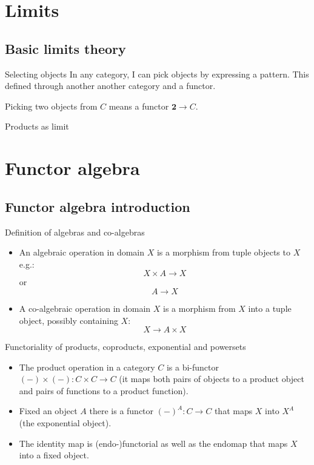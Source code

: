\documentclass[presentation]{beamer}
\begin{document}
\section{Limits}
\label{sec:org3b2836d}
\subsection{Basic limits theory}
\label{sec:org752afb4}
\begin{frame}[label={sec:orga82c59c}]{Selecting objects}
In any category, I can pick objects by expressing a pattern. This defined
through another another category and a functor.

Picking two objects from \(C\) means a functor \(\textbf{2} \rightarrow C\).
\end{frame}

\begin{frame}[label={sec:orgdc86793}]{Products as limit}
\end{frame}
\section{Functor algebra}
\label{sec:org8ecca67}
\subsection{Functor algebra introduction}
\label{sec:orgdbf39b5}
\begin{frame}[label={sec:org36c2895}]{Definition of algebras and co-algebras}
\begin{itemize}
\item An algebraic operation in domain \(X\) is a morphism from tuple objects to \(X\)
e.g.: $$ X \times A
      \rightarrow X$$ or $$ A \rightarrow X $$

\item A co-algebraic operation in domain \(X\) is a morphism from \(X\) into a tuple
object, possibly containing \(X\): $$ X \rightarrow A \times
      X $$
\end{itemize}
\end{frame}

\begin{frame}[label={sec:org4f065c5}]{Functoriality of products, coproducts, exponential and powersets}
\begin{itemize}
\item The product operation in a category \(C\) is a bi-functor \((-) \times (-): C
      \times C \rightarrow C\) (it maps both \alert{pairs of objects} to a \alert{product object}
and \alert{pairs of functions} to a \alert{product function}).

\item Fixed an object \(A\) there is a functor \((-)^A: C \rightarrow C\) that maps \(X\)
into \(X^A\) (the exponential object).

\item The identity map is (endo-)functorial as well as the endomap that maps \(X\)
into a fixed object.
\end{itemize}
\end{frame}
\end{document}
